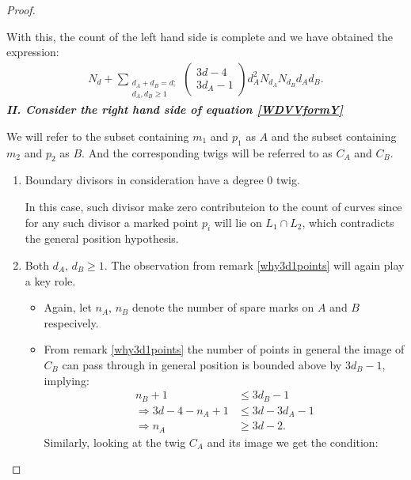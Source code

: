 \begin{proof}
\begin{enumerate}
\begin{itemize}
        \end{itemize}
    \end{enumerate}
    With this, the count of the left hand side is complete and we have obtained the expression:
    \begin{align}
        N_{d} + \sum_{\substack{d_{A}+d_{B} = d;\\ d_{A},d_{B} \geq 1}}
\begin{pmatrix}
        3d-4\\
        3d_{A} - 1
    \end{pmatrix}
    d^{2}_{A} N_{d_{A}} N_{d_{B}}d_{A} d_{B}. \label{kontLHS}
    \end{align}
    \textbf{\textit{II. Consider the right hand side of equation \ref{WDVVformY}}}
    \par We will refer to the subset containing $m_{1}$ and $p_{1}$ as $A$ and the subset containing $m_{2}$ and $p_{2}$ as $B$.
    And the corresponding twigs will be referred to as $C_{A}$ and $C_{B}$.
    \begin{enumerate}
        \item Boundary divisors in consideration have a degree $0$ twig.
            \par In this case, such divisor make zero contributeion to the count of curves since for any such divisor a marked point $p_{i}$ will lie on $L_{1}\cap L_{2}$, which contradicts the general position hypothesis.
        \item Both $d_{A}, \, d_{B} \geq 1$. 
            The observation from remark \ref{why3d1points} will again play a key role.
            \begin{itemize}
                \item Again, let $n_{A},\, n_{B}$ denote the number of spare marks on $A$ and $B$ respecively.
                \item From remark \ref{why3d1points} the number of points in general the image of $C_B$ can pass through in general position is bounded above by $3d_{B} - 1$, implying:
                    \begin{align}
                        n_{B} + 1 &\leq 3d_{B} -1 \\
                        \Rightarrow 3d-4 - n_{A} + 1 &\leq 3d - 3d_{A} - 1\\
                        \Rightarrow n_{A} &\geq 3d - 2 \label{nAcondr1}.
                    \end{align}
                    Similarly, looking at the twig $C_{A}$ and its image we get the condition:

\end{itemize}
\end{enumerate}
\end{proof}
